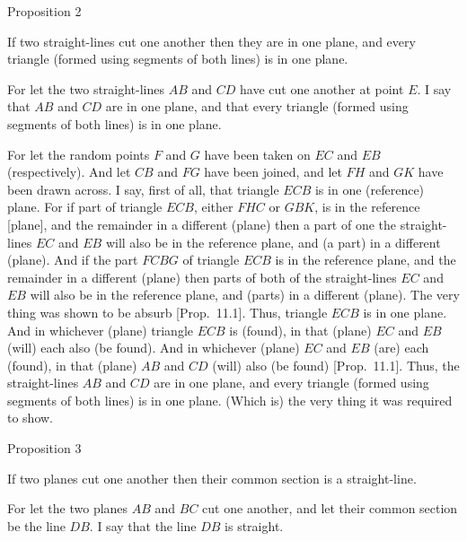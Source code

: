 \begin{center}
{\large Proposition 2}
\end{center}

If two straight-lines cut one another then they are
in one plane, and every triangle (formed using segments of
both lines) is in one plane.

\centerline{}

For let the two straight-lines $AB$ and $CD$ have cut one another at point
$E$. I say that $AB$ and $CD$ are in one plane, and that every
triangle (formed using segments of both lines) is in one plane.

For let the random points $F$ and $G$ have been taken on $EC$ and
$EB$ (respectively). And let $CB$ and $FG$ have been joined, and let
$FH$ and $GK$ have been drawn across. I say, first of all, that triangle
$ECB$ is in one (reference) plane. For if part of triangle $ECB$, either $FHC$ or
$GBK$, is in the reference [plane], and the remainder in a different (plane)
then a part  of one the straight-lines $EC$ and $EB$
will also be in the reference plane, and (a part) in a different (plane).
And if the part $FCBG$ of triangle $ECB$ is in the reference plane, and
the remainder in a different (plane) then parts of both of the straight-lines
$EC$ and $EB$ will also be in  the reference plane, and (parts) in a
different (plane). The very thing was shown to be absurb [Prop.~11.1]. Thus, triangle $ECB$ is in
one plane. And in whichever (plane) triangle $ECB$ is (found),  in that (plane) $EC$ and $EB$ (will) each also (be found). And in whichever (plane) 
 $EC$
and $EB$ (are) each (found), in that (plane) $AB$ and $CD$ (will) also (be found)  [Prop.~11.1]. Thus, the straight-lines $AB$ and
$CD$ are in one plane, and every triangle (formed using segments of
both lines) is in one plane. (Which is) the very thing it was required to
show.


\begin{center}
{\large Proposition 3}
\end{center}

If two planes cut one another then their common
section is a straight-line.

\epsfysize=1.8in
\centerline{}

For let the two planes $AB$ and $BC$ cut one another, and let their
common section be the line $DB$. I say that the line $DB$ is straight.

